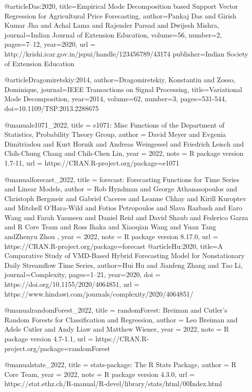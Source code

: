 @article{Das:2020,
  title={Empirical Mode Decomposition based Support Vector Regression  for Agricultural Price Forecasting},
  author={Pankaj Das and Girish Kumar Jha and Achal Lama and Rajender Parsad and Dwijesh Mishra},
  journal={Indian Journal of Extension Education},
  volume={56},
  number={2},
  pages={7--12},
  year={2020},
  url = {http://krishi.icar.gov.in/jspui/handle/123456789/43174}
  publisher={Indian Society of Extension Education}
}


@article{Dragomiretskiy:2014,
  author={Dragomiretskiy, Konstantin and Zosso, Dominique},
  journal={IEEE Transactions on Signal Processing}, 
  title={Variational Mode Decomposition}, 
  year={2014},
  volume={62},
  number={3},
  pages={531-544},
  doi={10.1109/TSP.2013.2288675}
}

@manual{e1071_2022,
  title = {e1071: Misc Functions of the Department of Statistics, Probability Theory Group},
  author = {David Meyer and Evgenia Dimitriadou and Kurt Hornik and Andreas Weingessel and Friedrich Leisch and Chih-Chung Chang and Chih-Chen Lin},
  year = {2022},
  note = {R package version 1.7-11},
  url = {https://CRAN.R-project.org/package=e1071}
}

@manual{forecast_2022,
  title = {forecast: Forecasting Functions for Time Series and Linear Models},
  author = {Rob Hyndman and George Athanasopoulos and Christoph Bergmeir and Gabriel Caceres and Leanne Chhay and Kirill Kuroptev and Mitchell O'Hara-Wild and Fotios Petropoulos and Slava Razbash and Earo Wang and Farah Yasmeen and Daniel Reid and David Shaub and Federico Garza and R Core Team and Ross Ihaka and Xiaoqian Wang and Yuan Tang andZhenyu Zhou },
  year = {2022},
  note = {R package version 8.17.0},
  url = {https://CRAN.R-project.org/package=forecast}
}
@article{Hu:2020,
  title={A Comparative Study of VMD-Based Hybrid Forecasting Model for Nonstationary Daily Streamflow Time Series},
  author={Hui Hu and Jianfeng Zhang and Tao Li},
  journal={Complexity},
  pages={1--21},
  year={2020},
  doi = {https://doi.org/10.1155/2020/4064851},
  url = {https://www.hindawi.com/journals/complexity/2020/4064851/}
}

@manual{randomForest_2022,
  title = {randomForest: Breiman and Cutler's Random Forests for Classification and Regression},
  author = {Leo Breiman and Adele Cutler and Andy Liaw and Matthew Wiener},
  year = {2022},
  note = {R package version 4.7-1.1},
  url = {https://CRAN.R-project.org/package=randomForest}
}

@manual{stats_2022,
  title = {stats-package: The R Stats Package},
  author = {R Core Team},
  year = {2022},
  note = {R package version 4.3.0},
  url = {https://stat.ethz.ch/R-manual/R-devel/library/stats/html/00Index.html}
}

